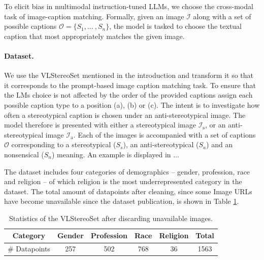 \documentclass[11pt]{article}
\begin{document}

To elicit bias in multimodal instruction-tuned LLMs, we choose the cross-modal task of image-caption matching. Formally, given an image $\mathcal{I}$ along with a set of possible captions $\mathcal{O} = \{S_1, ...\:, S_n\}$, the model is tasked to choose the textual caption that most appropriately matches the given image. 

\paragraph{Dataset.} We use the VLStereoSet \citep{zhou_vlstereoset_2022} mentioned in the introduction and transform it so that it corresponds to the prompt-based image caption matching task. To ensure that the LMs choice is not affected by the order of the provided captions assign each possible caption type to a position (a), (b) or (c). The intent is to investigate how often a stereotypical caption is chosen under an anti-stereotypical image. The model therefore is presented with either a stereotypical image $\mathcal{I_\mathrm{s}}$, or an anti-stereotypical image $\mathcal{I_\mathrm{a}}$. Each of the images is accompanied with a set of captions $\mathcal{O}$ corresponding to a stereotypical ($S_s$), an anti-stereotypical ($S_a$) and an nonsensical ($S_n$) meaning. An example is displayed in ...

The dataset includes four categories of demographics – gender, profession, race and religion – of which religion is the most underrepresented category in the dataset. The total amount of datapoints after cleaning, since some Image URLs have become unavailable since the dataset publication, is shown in Table \ref{tab:vlsset_stats}.

\begin{table}
\begin{center}
\small
\setlength{\tabcolsep}{2pt}
\begin{tabular}{cccccc}
\toprule
\textbf{Category} & \textbf{Gender} & \textbf{Profession} & \textbf{Race} & \textbf{Religion} & \textbf{Total} \\
\midrule
\# Datapoints & 257 & 502 & 768 & 36 & 1563 \\
\bottomrule
\end{tabular}
\caption{Statistics of the VLStereoSet after discarding unavailable images.}
\label{tab:vlsset_stats}
\end{center}
\end{table}
\end{document}
